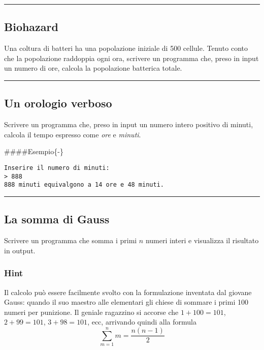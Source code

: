 \documentclass[
]{book}
\begin{document}
\begin{center}\rule{0.5\linewidth}{0.5pt}\end{center}

\hypertarget{biohazard}{%
\subsection{Biohazard}\label{biohazard}}

Una coltura di batteri ha una popolazione iniziale di 500 cellule. Tenuto conto che la popolazione raddoppia ogni ora, scrivere un programma che, preso in input un numero di ore, calcola la popolazione batterica totale.

\begin{center}\rule{0.5\linewidth}{0.5pt}\end{center}

\hypertarget{un-orologio-verboso}{%
\subsection{Un orologio verboso}\label{un-orologio-verboso}}

Scrivere un programma che, preso in input un numero intero positivo di minuti, calcola il tempo espresso come \emph{ore} e \emph{minuti}.

\#\#\#\#Esempio\{-\}

\begin{verbatim}
Inserire il numero di minuti:
> 888
888 minuti equivalgono a 14 ore e 48 minuti.
\end{verbatim}

\begin{center}\rule{0.5\linewidth}{0.5pt}\end{center}

\hypertarget{la-somma-di-gauss}{%
\subsection{La somma di Gauss}\label{la-somma-di-gauss}}

Scrivere un programma che somma i primi \(n\) numeri interi e visualizza il risultato in output.

\hypertarget{hint-1}{%
\subsubsection*{Hint}\label{hint-1}}

Il calcolo può essere facilmente svolto con la formulazione inventata dal giovane Gauss: quando il suo maestro alle elementari gli chiese di sommare i primi 100 numeri per punizione. Il geniale ragazzino si accorse che \(1+100=101\), \(2+99=101\), \(3+98=101\), ecc, arrivando quindi alla formula
\[
\sum_{m=1}^{n} m = \frac{n(n-1)}{2}
\]

  
\end{document}
